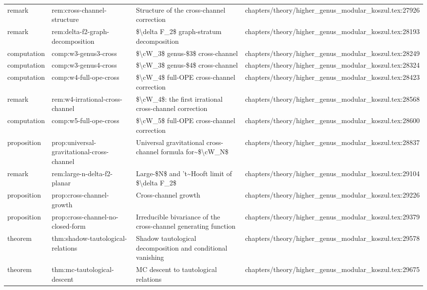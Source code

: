\documentclass[11pt]{article}
\begin{document}
\begin{longtable}{L{0.10\textwidth}L{0.26\textwidth}L{0.42\textwidth}L{0.22\textwidth}}
remark & rem:cross-channel-structure & Structure of the cross-channel correction & chapters/theory/higher\_genus\_modular\_koszul.tex:27926\\
remark & rem:delta-f2-graph-decomposition & \$\textbackslash{}delta F\_2\$ graph-stratum decomposition & chapters/theory/higher\_genus\_modular\_koszul.tex:28193\\
computation & comp:w3-genus3-cross & \$\textbackslash{}cW\_3\$ genus-\$3\$ cross-channel & chapters/theory/higher\_genus\_modular\_koszul.tex:28249\\
computation & comp:w3-genus4-cross & \$\textbackslash{}cW\_3\$ genus-\$4\$ cross-channel & chapters/theory/higher\_genus\_modular\_koszul.tex:28324\\
computation & comp:w4-full-ope-cross & \$\textbackslash{}cW\_4\$ full-OPE cross-channel correction & chapters/theory/higher\_genus\_modular\_koszul.tex:28423\\
remark & rem:w4-irrational-cross-channel & \$\textbackslash{}cW\_4\$: the first irrational cross-channel correction & chapters/theory/higher\_genus\_modular\_koszul.tex:28568\\
computation & comp:w5-full-ope-cross & \$\textbackslash{}cW\_5\$ full-OPE cross-channel correction & chapters/theory/higher\_genus\_modular\_koszul.tex:28600\\
proposition & prop:universal-gravitational-cross-channel & Universal gravitational cross-channel formula for\textasciitilde{}\$\textbackslash{}cW\_N\$ & chapters/theory/higher\_genus\_modular\_koszul.tex:28837\\
remark & rem:large-n-delta-f2-planar & Large-\$N\$ and 't\textasciitilde{}Hooft limit of \$\textbackslash{}delta F\_2\$ & chapters/theory/higher\_genus\_modular\_koszul.tex:29104\\
proposition & prop:cross-channel-growth & Cross-channel growth & chapters/theory/higher\_genus\_modular\_koszul.tex:29226\\
proposition & prop:cross-channel-no-closed-form & Irreducible bivariance of the cross-channel generating function & chapters/theory/higher\_genus\_modular\_koszul.tex:29379\\
theorem & thm:shadow-tautological-relations & Shadow tautological decomposition and cond{}itional vanishing & chapters/theory/higher\_genus\_modular\_koszul.tex:29578\\
theorem & thm:mc-tautological-descent & MC descent to tautological relations & chapters/theory/higher\_genus\_modular\_koszul.tex:29675\\

\end{longtable}
\end{document}
